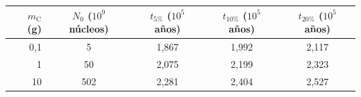 \begin{tabular}{rcccc}
\toprule
$m_{\mathrm{C}}$ (g) & $N_0$ ($10^{9}$ núcleos) & $t_{5\%}$ ($10^{5}$ años) & $t_{10\%}$ ($10^{5}$ años) & $t_{20\%}$ ($10^{5}$ años) \\
\midrule
0,1 & 5 & 1,867 & 1,992 & 2,117 \\
1 & 50 & 2,075 & 2,199 & 2,323 \\
10 & 502 & 2,281 & 2,404 & 2,527 \\
\bottomrule
\end{tabular}
